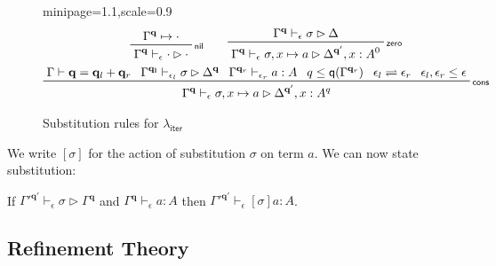 \documentclass[acmsmall,screen,anonymous,review]{acmart}
\newcommand{\mb}[1]{\ensuremath{\mathbf{#1}}}
\newcommand{\ms}[1]{\ensuremath{\mathsf{#1}}}
\newcommand{\qsp}[4]{#1 \vdash #2 = #3 + #4}
\newcommand{\cwk}[2]{#1 \mapsto #2}
\newcommand{\rle}[1]{{\scriptsize\textsf{#1}}}
\newcommand{\hasty}[4]{#1 \vdash_{#2} #3: {#4}}
\newcommand{\issubst}[4]{#1 \vdash_{#2} #3 \rhd #4}
\newcommand{\subiterexp}{\texorpdfstring{\(\lambda_{\ms{iter}}\)}{lambda-iter}}
\newcommand{\slides}{\rightleftharpoons}
\newcommand{\alquant}{\ms{q}}
\begin{document}
\begin{figure}
  \begin{adjustbox}{minipage=1.1\textwidth,scale=0.9}
  \begin{gather*}
    \prftree[r]{\rle{nil}}{\cwk{\Gamma^{\mb{q}}}{\cdot}}
                              {\issubst{\Gamma^{\mb{q}}}{\epsilon}{\cdot}{\cdot}} \qquad 
    \prftree[r]{\rle{zero}}
      {\issubst{\Gamma^{\mb{q}}}{\epsilon}{\sigma}{\Delta}}
      {\issubst{\Gamma^{\mb{q}}}{\epsilon}{\sigma, x \mapsto a}{\Delta^{\mb{q}'}, x : A^0}}
    \\
    \prftree[r]{\rle{cons}}
      {\qsp{\Gamma}{\mb{q}}{\mb{q}_l}{\mb{q}_r}}
      {\issubst{\Gamma^{\mb{q_l}}}{\epsilon_l}{\sigma}{\Delta^{\mb{q}}}}
      {\hasty{\Gamma^{\mb{q}_r}}{\epsilon_r}{a}{A}}
      {q \leq \alquant(\Gamma^{\mb{q}_r})}
      {\epsilon_l \slides \epsilon_r}
      {\epsilon_l, \epsilon_r \leq \epsilon}
      {\issubst{\Gamma^{\mb{q}}}{\epsilon}{\sigma, x \mapsto a}
      {\Delta^{\mb{q}'}, x : A^q}}
  \end{gather*}
  \end{adjustbox}
  \caption{Substitution rules for \subiterexp{}}
  \Description{}
  \label{fig:expr-subst}
\end{figure}%
We write $[\sigma]$ for the action of substitution $\sigma$ on term $a$. We can now state
substitution:
\begin{lemma}[name=Substitution, restate=synmonsubst]
  If ${\issubst{\Gamma'^{\mb{q}'}}{\epsilon}{\sigma}{\Gamma^{\mb{q}}}}$
  and ${\hasty{\Gamma^{\mb{q}}}{\epsilon}{a}{A}}$
  then ${\hasty{\Gamma'^{\mb{q}'}}{\epsilon}{[\sigma]a}{A}}$. 
\end{lemma}

\subsection{Refinement Theory}

\label{ssec:refinement-theory}
\end{document}
